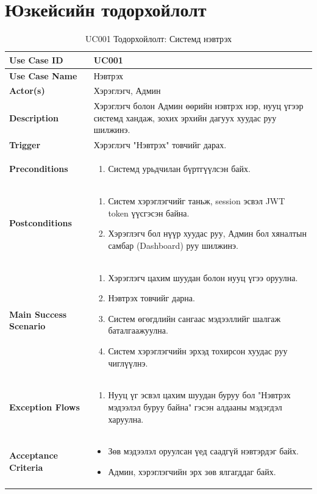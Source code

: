 \section{Юзкейсийн тодорхойлолт}

\begin{longtable}{|p{4cm}|p{11cm}|}
\caption{UC001 Тодорхойлолт: Системд нэвтрэх} \\
\hline
\textbf{Use Case ID} & UC001 \\ \hline
\textbf{Use Case Name} & Нэвтрэх \\ \hline
\textbf{Actor(s)} & Хэрэглэгч, Админ \\ \hline
\textbf{Description} & Хэрэглэгч болон Админ өөрийн нэвтрэх нэр, нууц үгээр системд хандаж, зохих эрхийн дагуух хуудас руу шилжинэ. \\ \hline
\textbf{Trigger} & Хэрэглэгч "Нэвтрэх" товчийг дарах. \\ \hline
\textbf{Preconditions} & 
\begin{enumerate}
    \item Системд урьдчилан бүртгүүлсэн байх.
\end{enumerate} \\ \hline
\textbf{Postconditions} & 
\begin{enumerate}
    \item Систем хэрэглэгчийг таньж, session эсвэл JWT token үүсгэсэн байна.
    \item Хэрэглэгч бол нүүр хуудас руу, Админ бол хяналтын самбар (Dashboard) руу шилжинэ.
\end{enumerate} \\ \hline
\textbf{Main Success Scenario} & 
\begin{enumerate}
    \item Хэрэглэгч цахим шуудан болон нууц үгээ оруулна.
    \item Нэвтрэх товчийг дарна.
    \item Систем өгөгдлийн сангаас мэдээллийг шалгаж баталгаажуулна.
    \item Систем хэрэглэгчийн эрхэд тохирсон хуудас руу чиглүүлнэ.
\end{enumerate} \\ \hline
\textbf{Exception Flows} & 
\begin{enumerate}
    \item[3a.] Нууц үг эсвэл цахим шуудан буруу бол "Нэвтрэх мэдээлэл буруу байна" гэсэн алдааны мэдэгдэл харуулна.
\end{enumerate} \\ \hline
\textbf{Acceptance Criteria} & 
\begin{itemize}
    \item Зөв мэдээлэл оруулсан үед саадгүй нэвтэрдэг байх.
    \item Админ, хэрэглэгчийн эрх зөв ялгагддаг байх.
\end{itemize} \\ \hline
\end{longtable}


